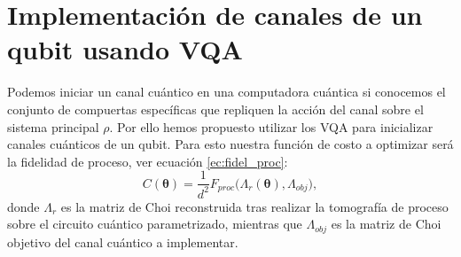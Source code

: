 \documentclass[letterpaper,12pt]{thesisECFM}
\theoremstyle{plain}
\theoremstyle{definition}
\theoremstyle{definition}
\theoremstyle{remark}
\newcommand{\1}{\mathbb{1}}
\begin{document}
\section{Implementación de canales de un qubit usando VQA}\label{sec:impl_vqa}  %
Podemos iniciar un canal cuántico en una computadora cuántica si conocemos el conjunto de compuertas específicas que repliquen la acción del canal sobre el sistema principal $\rho$. Por ello hemos propuesto utilizar los VQA para inicializar canales cuánticos de un qubit. Para esto nuestra función de costo a optimizar será la fidelidad de proceso, ver ecuación \ref{ec:fidel_proc}:
\begin{equation}
    \label{ec:cost_func}
    C(\bm{\theta}) = \frac{1}{d^2} F_{proc}\bigl( \Lambda_r(\bm{\theta}), \Lambda_{obj} \bigr),
\end{equation}
 donde $\Lambda_r$ es la matriz de Choi reconstruida tras realizar la
tomografía de proceso sobre el circuito cuántico parametrizado, mientras que
$\Lambda_{obj}$ es la matriz de Choi objetivo del canal cuántico a implementar.
 
\end{document}
